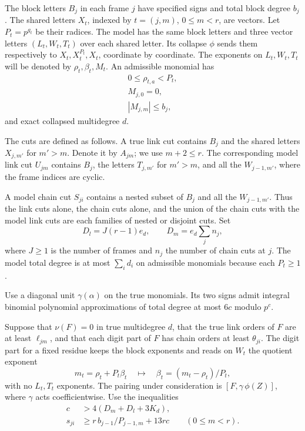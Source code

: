 \begin{paramdefinition}\label{hyp:plane-gram-data}
The block letters \(B_j\) in each frame \(j\) have specified
signs and total block degree \(b_j\). The shared letters \(X_t\),
indexed by \(t=(j,m)\), \(0\le m<r\), are vectors. Let
\(P_t=p^{g_t}\) be their radices. The model has the same
block letters and three vector letters \((L_t,W_t,T_t)\)
over each shared letter. Its collapse \(\phi\) sends them
respectively to \(X_t,X_t^{P_t},X_t\), coordinate by coordinate.
The exponents on \(L_t,W_t,T_t\) will be denoted by
\(\rho_t,\beta_t,M_t\). An admissible monomial has
\[
 \begin{gathered}
 0\le\rho_{t,a}<P_t, \\ M_{j,0}=0, \\ |M_{j,m}|\le b_j,
\end{gathered}
\]
and exact collapsed multidegree \(d\).

\smallskip
The cuts are defined as follows.
A true link cut contains \(B_j\) and the shared letters
\(X_{j,m'}\) for \(m'>m\). Denote it by \(A_{jm}\);
we use \(m+2\le r\). The corresponding model link cut
\(U_{jm}\) contains \(B_j\), the letters \(T_{j,m'}\)
for \(m'>m\), and all the \(W_{j-1,m'}\), where the frame
indices are cyclic.

A model chain cut \(S_{ji}\) contains a
nested subset of \(B_j\) and all the \(W_{j-1,m'}\).
Thus the link cuts alone, the chain cuts alone, and the
union of the chain cuts with the model link cuts are each
families of nested or disjoint cuts. Set
\[
 D_l=J(r-1)e_d,\qquad D_m=e_d\sum_j n_j,
\]
where \(J\ge1\) is the number of frames and \(n_j\) the
number of chain cuts at \(j\). The model total degree is
at most \(\sum_i d_i\) on admissible monomials because
each \(P_t\ge1\).

Use a diagonal unit \(\gamma(\alpha)\) on the true
monomials. Its two signs admit integral binomial polynomial
approximations of total degree at most \(6c\) modulo \(p^c\).

Suppose that \(\nu(F)=0\) in true multidegree \(d\), that
the true link orders of \(F\) are at least \(\ell_{jm}\),
and that each digit part of \(F\) has chain orders at least
\(\theta_{ji}\). The digit part for a fixed residue keeps the
block exponents and reads on \(W_t\) the quotient exponent
\[
 m_t=\rho_t+P_t\beta_t\quad\longmapsto\quad \beta_t=(m_t-\rho_t)/P_t,
\]
with no \(L_t,T_t\) exponents.
The pairing under consideration is \([F,\gamma\,\phi(Z)]\),
where \(\gamma\) acts coefficientwise. Use the inequalities
\begin{equation}\label{eq:plane-gram-reserves}
 \begin{split}
    c&>4(D_m+D_l+3K_d),\\
    s_{ji}&\ge r\, b_{j-1}/P_{j-1,m}+13rc
                     \qquad(0\le m<r).
 \end{split}
\end{equation}
\end{paramdefinition}
